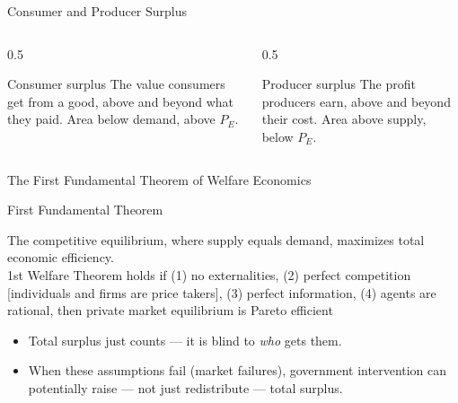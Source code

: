 \documentclass[11pt,aspectratio=169]{beamer}
\begin{document}
\begin{frame}{Consumer and Producer Surplus}
  \begin{columns}[T]
    \begin{column}{0.5\textwidth}
      \begin{block}{Consumer surplus}
        The value consumers get from a good, above and beyond what they paid. Area below demand, above $P_E$.
      \end{block}
    \end{column}
    \begin{column}{0.5\textwidth}
      \begin{block}{Producer surplus}
        The profit producers earn, above and beyond their cost. Area above supply, below $P_E$.
      \end{block}
    \end{column}
  \end{columns}
  \begin{center}
  \end{center}
\end{frame}

\begin{frame}{The First Fundamental Theorem of Welfare Economics}
  \begin{alertblock}{First Fundamental Theorem}
    \end{alertblock}
    The competitive equilibrium, where supply equals demand, maximizes total economic  efficiency. \\
  1st Welfare Theorem holds if (1) no externalities, (2) perfect competition [individuals and
firms are price takers], (3) perfect information, (4) agents are rational, then private
market equilibrium is Pareto efficient
  \begin{itemize}
    \item Total surplus just counts \texteuro{} --- it is blind to \emph{who} gets them.
    \item When these assumptions fail (market failures), government intervention can potentially raise --- not just redistribute --- total surplus.
  \end{itemize}

\end{frame}
\end{document}
